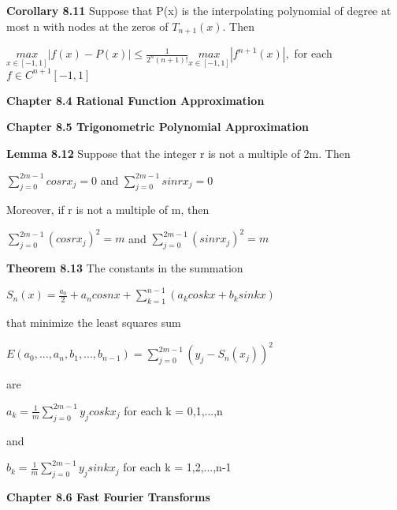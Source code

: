 \documentclass{article}
\begin{document}
\textbf {Corollary 8.11} Suppose that P(x) is the interpolating polynomial of degree at most n with nodes at the zeros of $T_{n+1} (x)$. Then
\begin{center}
$\underset{x \in [-1,1]}{max} |f(x) - P(x)| \leq \frac {1} {2^n (n+1)!} \underset{x \in [-1,1]}{max} |f^{n+1} (x)|,$ \tab for each $f \in C^{n+1} [-1,1]$
\end{center}

\textbf {Chapter 8.4 Rational Function Approximation}

\textbf {Chapter 8.5 Trigonometric Polynomial Approximation}

\textbf {Lemma 8.12} Suppose that the integer r is not a multiple of 2m. Then
\begin{center}
$\sum_{j=0}^{2m-1} cos rx_j = 0$ and $\sum_{j=0}^{2m-1} sin rx_j = 0$
\end{center}
Moreover, if r is not a multiple of m, then
\begin{center}
$\sum_{j=0}^{2m-1} (cos rx_j)^2 = m$  and  $\sum_{j=0}^{2m-1} (sin rx_j)^2 = m$
\end{center}

\textbf {Theorem 8.13} The constants in the summation 
\begin{center}
$S_n (x) = \frac{a_0}{2} + a_n cos nx + \sum_{k=1}^{n-1} (a_k cos kx + b_k sin kx)$
\end{center}
that minimize the least squares sum
\begin{center}
$E(a_0,..., a_n, b_1,..., b_{n-1}) = \sum_{j=0}^{2m-1} (y_j - S_n (x_j))^2$
\end{center}
are
\begin{center}
$a_k = \frac {1} {m} \sum_{j=0}^{2m-1} y_j cos k x_j$ \tab for each k = 0,1,...,n
\end{center}
and 
\begin{center}
$b_k = \frac{1}{m} \sum_{j=0}^{2m-1} y_j sin kx_j$ \tab for each k = 1,2,...,n-1
\end{center}

\textbf {Chapter 8.6 Fast Fourier Transforms}
\end{document}
